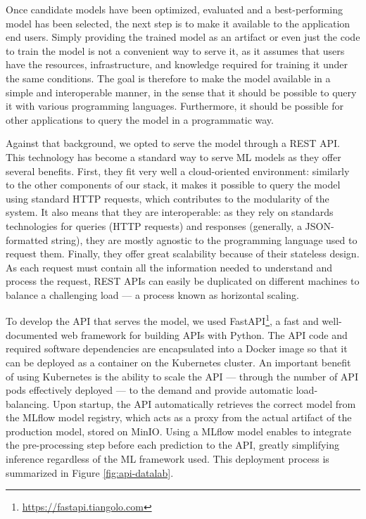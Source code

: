 Once candidate models have been optimized, evaluated and a best-performing model has been selected, the next step is to make it available to the application end users. Simply providing the trained model as an artifact or even just the code to train the model is not a convenient way to serve it, as it assumes that users have the resources, infrastructure, and knowledge required for training it under the same conditions. The goal is therefore to make the model available in a simple and interoperable manner, in the sense that it should be possible to query it with various programming languages. Furthermore, it should be possible for other applications to query the model in a programmatic way. 

Against that background, we opted to serve the model through a REST API. This technology has become a standard way to serve ML models as they offer several benefits. First, they fit very well a cloud-oriented environment: similarly to the other components of our stack, it makes it possible to query the model using standard HTTP requests, which contributes to the modularity of the system. It also means that they are interoperable: as they rely on standards technologies for queries (HTTP requests) and responses (generally, a JSON-formatted string), they are mostly agnostic to the programming language used to request them. Finally, they offer great scalability because of their stateless design. As each request must contain all the information needed to understand and process the request, REST APIs can easily be duplicated on different machines to balance a challenging load — a process known as horizontal scaling.

To develop the API that serves the model, we used FastAPI\footnote{\url{https://fastapi.tiangolo.com}}, a fast and well-documented web framework for building APIs with Python. The API code and required software dependencies are encapsulated into a Docker image so that it can be deployed as a container on the Kubernetes cluster. An important benefit of using Kubernetes is the ability to scale the API — through the number of API pods effectively deployed — to the demand and provide automatic load-balancing. Upon startup, the API automatically retrieves the correct model from the MLflow model registry, which acts as a proxy from the actual artifact of the production model, stored on MinIO. Using a MLflow model enables to integrate the pre-processing step before each prediction to the API, greatly simplifying inference regardless of the ML framework used. This deployment process is summarized in Figure \ref{fig:api-datalab}.

